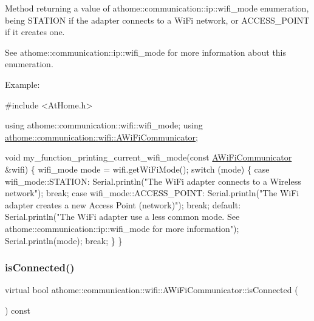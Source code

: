 Method returning a value of athome\+::communication\+::ip\+::wifi\+\_\+mode enumeration, being S\+T\+A\+T\+I\+ON if the adapter connects to a Wi\+Fi network, or A\+C\+C\+E\+S\+S\+\_\+\+P\+O\+I\+NT if it creates one.

See athome\+::communication\+::ip\+::wifi\+\_\+mode for more information about this enumeration.

Example\+:


\begin{DoxyCode}
\textcolor{preprocessor}{#include <AtHome.h>}

\textcolor{keyword}{using} athome::communication::wifi::wifi\_mode;
\textcolor{keyword}{using} \mbox{\hyperlink{classathome_1_1communication_1_1wifi_1_1_a_wi_fi_communicator}{athome::communication::wifi::AWiFiCommunicator}};

\textcolor{keywordtype}{void} my\_function\_printing\_current\_wifi\_mode(\textcolor{keyword}{const} \mbox{\hyperlink{classathome_1_1communication_1_1wifi_1_1_a_wi_fi_communicator_a0098148fe8d0eeee99b7f8f72a72a900}{AWiFiCommunicator}} &wifi) \{
  wifi\_mode mode = wifi.getWiFiMode();
  \textcolor{keywordflow}{switch} (mode) \{
    \textcolor{keywordflow}{case} wifi\_mode::STATION:
      Serial.println(\textcolor{stringliteral}{"The WiFi adapter connects to a Wireless network"});
      \textcolor{keywordflow}{break};
    \textcolor{keywordflow}{case} wifi\_mode::ACCESS\_POINT:
      Serial.println(\textcolor{stringliteral}{"The WiFi adapter creates a new Access Point (network)"});
      \textcolor{keywordflow}{break};
    \textcolor{keywordflow}{default}:
      Serial.println(\textcolor{stringliteral}{"The WiFi adapter use a less common mode. See athome::communication::ip::wifi\_mode for
       more information"});
      Serial.println(mode);
      \textcolor{keywordflow}{break};
  \}
\}
\end{DoxyCode}
 \mbox{\label{classathome_1_1communication_1_1wifi_1_1_a_wi_fi_communicator_a578087d01c814481d89ea702a6d7ed01}} 
\subsubsection{\texorpdfstring{is\+Connected()}{isConnected()}}
{\footnotesize\ttfamily virtual bool athome\+::communication\+::wifi\+::\+A\+Wi\+Fi\+Communicator\+::is\+Connected (\begin{DoxyParamCaption}{ }\end{DoxyParamCaption}) const\hspace{0.3cm}{\ttfamily [pure virtual]}}

